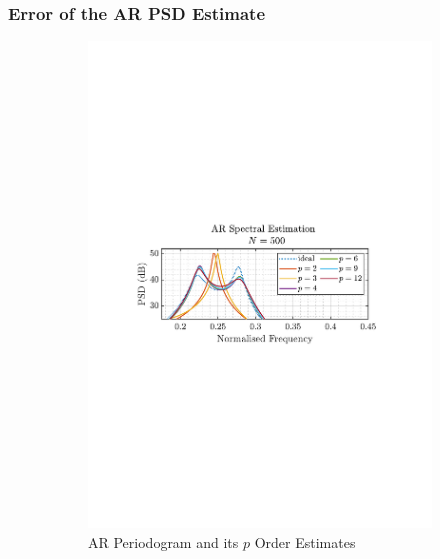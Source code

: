 \documentclass[12pt]{article}
\begin{document}
	\subsubsection{Error of the AR PSD Estimate}
	\begin{figure}[H]
		\centering
		\begin{subfigure}{0.49\textwidth}
			\centering
			\includegraphics[trim={2.2cm 11.2cm 3.15cm  11.2cm}, clip, width=\textwidth]{../MATLAB/figures/q1_4b_fig14.pdf} 
			\captionsetup{justification=centering}
			\caption{AR Periodogram and its $p$ Order Estimates}
		\end{subfigure}
		\begin{subfigure}{0.49\textwidth}
			\centering

\end{subfigure}
\end{figure}
\end{document}
